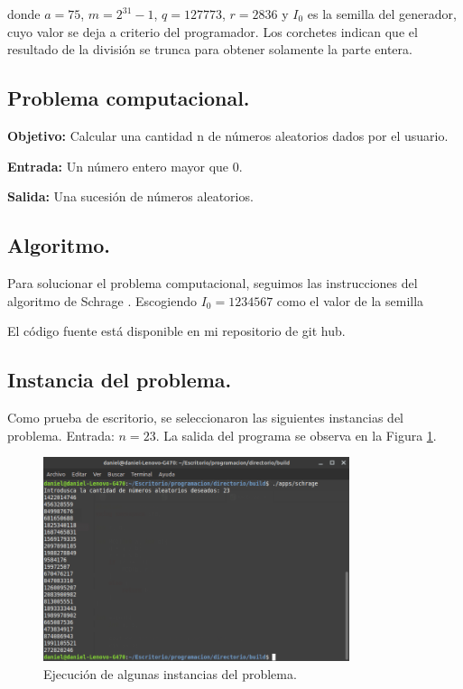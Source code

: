 \documentclass[12pt,letterpaper]{article}
\begin{document}
{donde $a = 75$, $m = 2^{31}-1$, $q = 127773$, $r = 2836$ y $I_0$ es la semilla del generador, cuyo valor se deja a criterio del programador. Los corchetes indican que el resultado de la divisi\'on se trunca para obtener solamente la parte entera.


\subsection{Problema computacional.}
\textbf{Objetivo:} Calcular una cantidad n de n\'umeros aleatorios dados por el usuario.

\textbf{Entrada:} Un n\'umero entero mayor que 0.

\textbf{Salida:} Una sucesi\'on de n\'umeros aleatorios.

\subsection{Algoritmo.}
Para solucionar el problema computacional, seguimos las instrucciones del algoritmo de Schrage \cite{url:rage}. Escogiendo $I_0 = 1234567$ como el valor de la semilla


El código fuente está disponible en mi repositorio de git hub. \cite{url:schrage}

\subsection{Instancia del problema.}
Como prueba de escritorio, se seleccionaron las siguientes instancias del problema. Entrada: $n = 23$. La salida del programa se observa en la Figura \ref{fig:schrage}.
\begin{figure}[ht!]
  \centering
  \includegraphics[width=0.8\textwidth]{figures/schrage}
  \caption{Ejecución de algunas instancias del problema.}
  \label{fig:schrage}
\end{figure}


}
\end{document}
